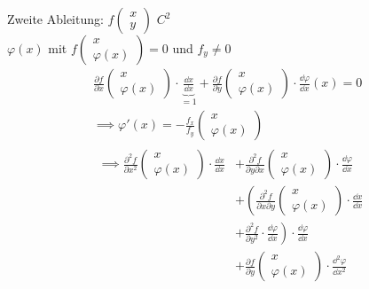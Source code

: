 \begin{bsp*}
	Zweite Ableitung: $f\begin{pmatrix} x \\ y \end{pmatrix}$ $C^2$ \\
	$\varphi(x)$ mit $f\begin{pmatrix} x \\ \varphi(x) \end{pmatrix} = 0$ und $f_y \neq 0$
	\begin{gather*}
		\frac{\partial f}{\partial x}\begin{pmatrix} x \\ \varphi(x) \end{pmatrix} \cdot \underbrace{\frac{\dd x}{\dd x}}_{=1} + \frac{\partial f}{\partial y}\begin{pmatrix} x \\ \varphi(x) \end{pmatrix} \cdot \frac{\dd \varphi}{\dd x}(x) = 0 \\
		\implies \varphi'(x) = - \frac{f_x}{f_y}\begin{pmatrix} x \\ \varphi(x) \end{pmatrix} \\
		\begin{split}
			\implies \frac{\partial^2 f}{\partial x^2}\begin{pmatrix} x \\ \varphi(x) \end{pmatrix} \cdot \frac{\dd x}{\dd x}
				&+ \frac{\partial^2 f}{\partial y \partial x}\begin{pmatrix} x \\ \varphi(x) \end{pmatrix} \cdot \frac{\dd \varphi}{\dd x} \\
				&+ \left( \frac{\partial^2 f}{\partial x \partial y}\begin{pmatrix} x \\ \varphi(x) \end{pmatrix} \cdot \frac{\dd x}{\dd x} \right. \\
				&\left. + \frac{\partial^2 f}{\partial y^2} \cdot \frac{\dd \varphi}{\dd x} \right) \cdot \frac{\dd \varphi}{\dd x} \\
				&+ \frac{\partial f}{\partial y}\begin{pmatrix} x \\ \varphi(x) \end{pmatrix} \cdot \frac{\dd^2 \varphi}{\dd x^2} \\

\end{split}
\end{gather*}
\end{bsp*}
